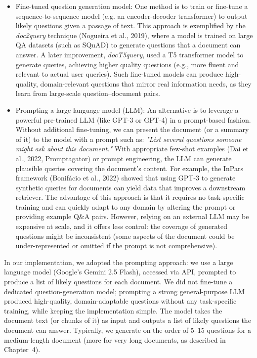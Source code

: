\documentclass[12pt,a4paper]{report}
\begin{document}
\begin{itemize}
\item Fine-tuned question generation model: One method is to train or fine-tune a sequence-to-sequence model (e.g. an encoder-decoder transformer) to output likely questions given a passage of text. This approach is exemplified by the \textit{doc2query} technique (Nogueira et al., 2019), where a model is trained on large QA datasets (such as SQuAD) to generate questions that a document can answer. A later improvement, \textit{docT5query}, used a T5 transformer model to generate queries, achieving higher quality questions (e.g., more fluent and relevant to actual user queries). Such fine-tuned models can produce high-quality, domain-relevant questions that mirror real information needs, as they learn from large-scale question--document pairs.

\item Prompting a large language model (LLM): An alternative is to leverage a powerful pre-trained LLM (like GPT-3 or GPT-4) in a prompt-based fashion. Without additional fine-tuning, we can present the document (or a summary of it) to the model with a prompt such as: \textit{"List several questions someone might ask about this document."} With appropriate few-shot examples (Dai et al., 2022, Promptagator) or prompt engineering, the LLM can generate plausible queries covering the document's content. For example, the InPars framework (Bonif\'acio et al., 2022) showed that using GPT-3 to generate synthetic queries for documents can yield data that improves a downstream retriever. The advantage of this approach is that it requires no task-specific training and can quickly adapt to any domain by altering the prompt or providing example Q\&A pairs. However, relying on an external LLM may be expensive at scale, and it offers less control: the coverage of generated questions might be inconsistent (some aspects of the document could be under-represented or omitted if the prompt is not comprehensive).
\end{itemize}

In our implementation, we adopted the prompting approach: we use a large language model (Google's Gemini 2.5 Flash), accessed via API, prompted to produce a list of likely questions for each document. We did not fine-tune a dedicated question-generation model; prompting a strong general-purpose LLM produced high-quality, domain-adaptable questions without any task-specific training, while keeping the implementation simple. The model takes the document text (or chunks of it) as input and outputs a list of likely questions the document can answer. Typically, we generate on the order of 5--15 questions for a medium-length document (more for very long documents, as described in Chapter~4). 
\end{document}
